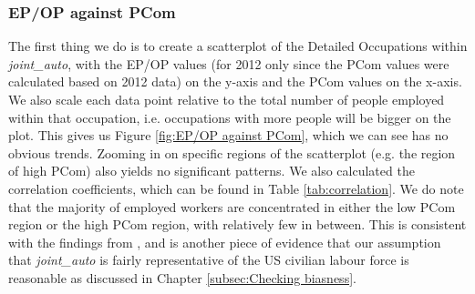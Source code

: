 \documentclass[11pt]{article}
\begin{document}
\subsubsection*{EP/OP against PCom}

The first thing we do is to create a scatterplot of the Detailed Occupations within \emph{joint\_auto}, with the EP/OP values (for 2012 only since the PCom values were calculated based on 2012 data) on the y-axis and the PCom values on the x-axis. We also scale each data point relative to the total number of people employed within that occupation, i.e. occupations with more people will be bigger on the plot. This gives us Figure \ref{fig:EP/OP against PCom}, which we can see has no obvious trends. Zooming in on specific regions of the scatterplot (e.g. the region of high PCom) also yields no significant patterns. We also calculated the correlation coefficients, which can be found in Table \ref{tab:correlation}. We do note that the majority of employed workers are concentrated in either the low PCom region or the high PCom region, with relatively few in between. This is consistent with the findings from \cite{osborne2017future}, and is another piece of evidence that our assumption that \emph{joint\_auto} is fairly representative of the US civilian labour force is reasonable as discussed in Chapter \ref{subsec:Checking biasness}. 
\end{document}
